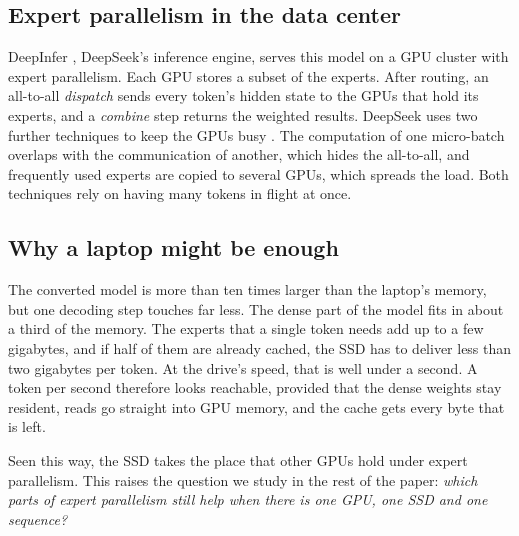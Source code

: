 \subsection{Expert parallelism in the data center}
DeepInfer \citep{deepinfer}, DeepSeek's inference engine, serves this model on a GPU cluster with expert parallelism. Each GPU stores a subset of the experts. After routing, an all-to-all \emph{dispatch} sends every token's hidden state to the GPUs that hold its experts, and a \emph{combine} step returns the weighted results. DeepSeek uses two further techniques to keep the GPUs busy \citep{deepseekv3}. The computation of one micro-batch overlaps with the communication of another, which hides the all-to-all, and frequently used experts are copied to several GPUs, which spreads the load. Both techniques rely on having many tokens in flight at once.

\subsection{Why a laptop might be enough}
The converted model is more than ten times larger than the laptop's memory, but one decoding step touches far less. The dense part of the model fits in about a third of the memory. The experts that a single token needs add up to a few gigabytes, and if half of them are already cached, the SSD has to deliver less than two gigabytes per token. At the drive's speed, that is well under a second. A token per second therefore looks reachable, provided that the dense weights stay resident, reads go straight into GPU memory, and the cache gets every byte that is left.

Seen this way, the SSD takes the place that other GPUs hold under expert parallelism. This raises the question we study in the rest of the paper: \emph{which parts of expert parallelism still help when there is one GPU, one SSD and one sequence?}

